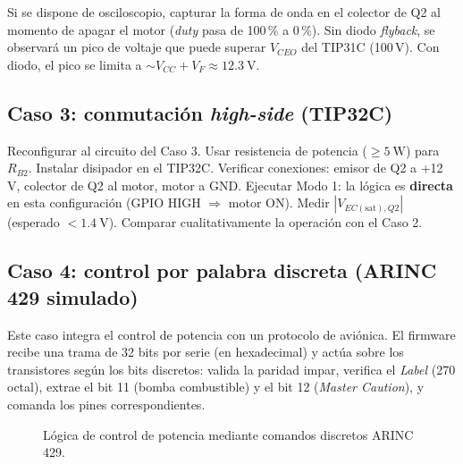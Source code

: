 \documentclass[11pt]{article}
\begin{document}
\begin{nota}
Si se dispone de osciloscopio, capturar la forma de onda en el colector de Q2 al momento
de apagar el motor (\emph{duty} pasa de 100\,\% a 0\,\%). Sin diodo \emph{flyback}, se
observará un pico de voltaje que puede superar $V_{CEO}$ del TIP31C (100\,V). Con diodo,
el pico se limita a $\sim V_{CC}+V_F\approx\SI{12.3}{\volt}$.
\end{nota}

\subsection{Caso 3: conmutación \emph{high-side} (TIP32C)}
Reconfigurar al circuito del Caso 3. Usar resistencia de potencia ($\ge\SI{5}{\watt}$)
para $R_{B2}$. Instalar disipador en el TIP32C. Verificar conexiones: emisor de Q2 a
+12\,V, colector de Q2 al motor, motor a GND. Ejecutar Modo 1: la lógica es
\textbf{directa} en esta configuración (GPIO HIGH $\Rightarrow$ motor ON). Medir
$|V_{EC(\text{sat}),Q2}|$ (esperado $<\SI{1.4}{\volt}$). Comparar cualitativamente la
operación con el Caso 2.

\subsection{Caso 4: control por palabra discreta (ARINC 429 simulado)}
Este caso integra el control de potencia con un protocolo de aviónica. El firmware recibe
una trama de 32 bits por serie (en hexadecimal) y actúa sobre los transistores según los
bits discretos: valida la paridad impar, verifica el \emph{Label} (270 octal), extrae el
bit 11 (bomba combustible) y el bit 12 (\emph{Master Caution}), y comanda los pines
correspondientes.

\begin{figure}[H]\centering
{}
\caption{Lógica de control de potencia mediante comandos discretos ARINC 429.}
\end{figure}
\end{document}
